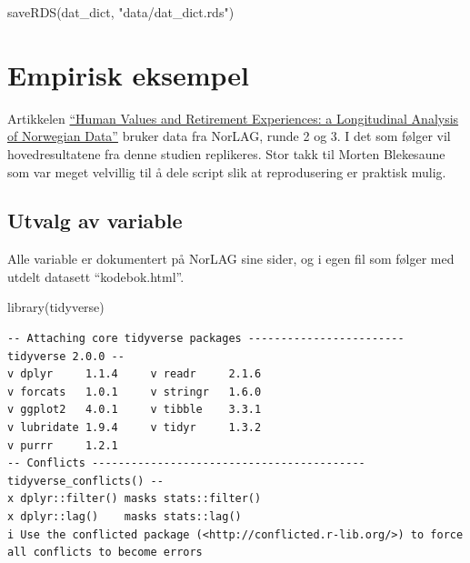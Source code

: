 \documentclass[
  norsk,
  letterpaper,
  DIV=11,
  numbers=noendperiod]{scrreprt}
\newenvironment{Shaded}{\begin{snugshade}}{\end{snugshade}}
\newcommand{\FunctionTok}[1]{\textcolor[rgb]{0.28,0.35,0.67}{#1}}
\newcommand{\NormalTok}[1]{\textcolor[rgb]{0.00,0.23,0.31}{#1}}
\newcommand{\StringTok}[1]{\textcolor[rgb]{0.13,0.47,0.30}{#1}}
\theoremstyle{definition}
\theoremstyle{remark}
\begin{document}
\begin{Shaded}
\begin{Highlighting}[]
\FunctionTok{saveRDS}\NormalTok{(dat\_dict, }\StringTok{"data/dat\_dict.rds"}\NormalTok{)}
\end{Highlighting}
\end{Shaded}

\chapter{Empirisk eksempel}\label{empirisk-eksempel}

Artikkelen
\href{https://link.springer.com/article/10.1007/s11205-021-02687-7}{``Human
Values and Retirement Experiences: a Longitudinal Analysis of Norwegian
Data''} bruker data fra NorLAG, runde 2 og 3. I det som følger vil
hovedresultatene fra denne studien replikeres. Stor takk til Morten
Blekesaune som var meget velvillig til å dele script slik at
reprodusering er praktisk mulig.

\section{Utvalg av variable}\label{utvalg-av-variable}

Alle variable er dokumentert på NorLAG sine sider, og i egen fil som
følger med utdelt datasett ``kodebok.html''.

\begin{Shaded}
\begin{Highlighting}[]
\FunctionTok{library}\NormalTok{(tidyverse)}
\end{Highlighting}
\end{Shaded}

\begin{verbatim}
-- Attaching core tidyverse packages ------------------------ tidyverse 2.0.0 --
v dplyr     1.1.4     v readr     2.1.6
v forcats   1.0.1     v stringr   1.6.0
v ggplot2   4.0.1     v tibble    3.3.1
v lubridate 1.9.4     v tidyr     1.3.2
v purrr     1.2.1     
-- Conflicts ------------------------------------------ tidyverse_conflicts() --
x dplyr::filter() masks stats::filter()
x dplyr::lag()    masks stats::lag()
i Use the conflicted package (<http://conflicted.r-lib.org/>) to force all conflicts to become errors
\end{verbatim}
\end{document}
